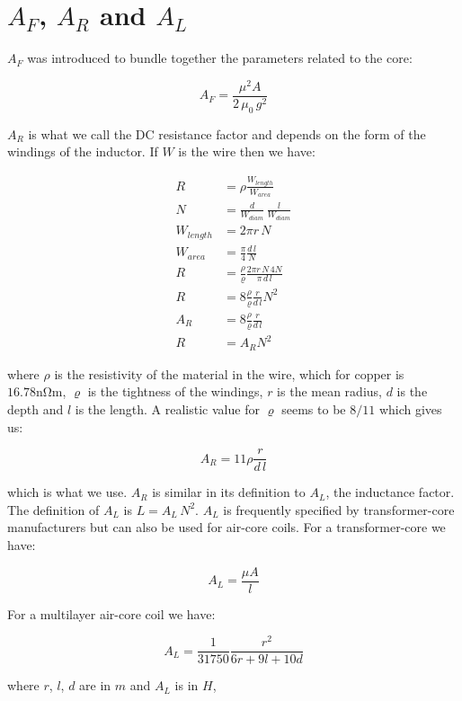 \documentclass[]{../common/elementary-physics}
\begin{document}
\section{$A_F$, $A_R$ and $A_L$}

$A_F$ was introduced to bundle together the parameters related to the core:

\begin{equation}
A_F = \frac{\mu^2 A}{2 \, \mu_0 \, g^2}
\end{equation}

$A_R$ is what we call the DC resistance factor and depends on the form of the windings of the inductor.
If $W$ is the wire then we have:

\begin{subequations}
\begin{align}
R &= \rho \frac{W_{length}}{W_{area}} \\
N &= \frac{d}{W_{diam}} \, \frac{l}{W_{diam}} \\
W_{length} &= 2 \pi r \, N \\
W_{area} &= \frac{\pi}{4} \frac{d \, l}{N} \\
R &= \frac{\rho}{\varrho} \frac{2 \pi r \, N \, 4 N}{\pi \, d \, l} \\
R &= 8 \frac{\rho}{\varrho} \frac{r}{d \, l} N^2 \\
A_R &= 8 \frac{\rho}{\varrho} \frac{r}{d \, l} \\
R &= A_R N^2
\end{align}
\end{subequations}

where $\rho$ is the resistivity of the material in the wire, which for copper is $16.78 \si{\nano\ohm\metre}$, $\varrho$ is the tightness of the windings, $r$ is the mean radius, $d$ is the depth and $l$ is the length.
A realistic value for $\varrho$ seems to be $8/11$ which gives us:

\begin{equation}
A_R = 11 \rho \frac{r}{d \, l}
\end{equation}

which is what we use.
$A_R$ is similar in its definition to $A_L$, the inductance factor.
The definition of $A_L$ is $L = A_L \, N^2$.
$A_L$ is frequently specified by transformer-core manufacturers but can also be used for air-core coils. 
For a transformer-core we have:

\begin{equation}
A_L = \frac{\mu A}{l}
\end{equation}

For a multilayer air-core coil we have\cite{wpind}:

\begin{equation}
A_L = \frac{1}{31750} \frac{r^2}{6r+9l+10d}
\end{equation}

where $r$, $l$, $d$ are in $m$ and $A_L$ is in $H$,



\printbibliography
\end{document}

